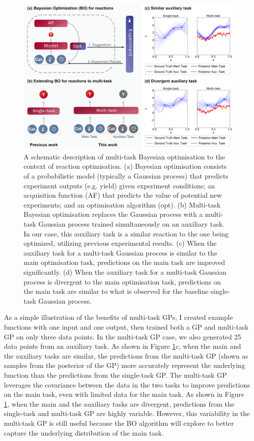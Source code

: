 \begin{figure}
    \centering
    \includegraphics[width=1.2\textwidth]{gfx/Chapter04/paper_figure_1.png}
    \caption{A schematic description of multi-task Bayesian optimisation to the context of reaction optimisation. (a) Bayesian optimisation consists of a probabilistic model (typically a Gaussian process) that predicts experiment outputs (e.g. yield) given experiment conditions; an acquisition function (AF) that predicts the value of potential new experiments; and an optimisation algorithm (opt). (b) Multi-task Bayesian optimisation replaces the Gaussian process with a multi-task Gaussian process trained simultaneously on an auxiliary task. In our case, this auxiliary task is a similar reaction to the one being optimized, utilizing previous experimental results. (c) When the auxiliary task for a multi-task Gaussian process is similar to the main optimisation task, predictions on the main task are improved significantly. (d) When the auxiliary task for a multi-task Gaussian process is divergent to the main optimisation task, predictions on the main task are similar to what is observed for the baseline single-task Gaussian process.}
    \label{fig:multitask_overview}
\end{figure}

As a simple illustration of the benefits of multi-task GPs, I created example functions with one input and one output, then trained both a GP and multi-task GP on only three data points. In the multi-task GP case, we also generated 25 data points from an auxiliary task. As shown in Figure \ref{fig:multitask_overview}c, when the main and the auxiliary tasks are similar, the predictions from the multi-task GP (shown as samples from the posterior of the GP) more accurately represent the underlying function than the predictions from the single-task GP. The multi-task GP leverages the covariance between the data in the two tasks to improve predictions on the main task, even with limited data for the main task. As shown in Figure \ref{fig:multitask_overview}, when the main and the auxiliary tasks are divergent, predictions from the single-task and multi-task GP are highly variable. However, this variability in the multi-task GP is still useful because the BO algorithm will explore to better capture the underlying distribution of the main task.


